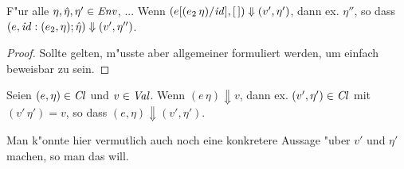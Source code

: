 \documentclass[12pt,fleqn,a4paper]{article}
\newcommand{\Cl}{\name{Cl}}
\begin{document}
\begin{lemma}[Koinzidenz] \label{lemma:Koinzidenz}
  F"ur alle $\eta,\hat{\eta},\eta'\in{\text{\it Env\/}}$, ...
  Wenn $(e[(e_2\,\eta)/{\text{\it id\/}}],[\,]) \Downarrow (v',\eta')$, dann ex. $\eta''$, so dass
  $(e,{\text{\it id\/}}:(e_2,\eta);\hat{\eta}) \Downarrow (v',\eta'')$.
\end{lemma}

\begin{proof}
  Sollte gelten, m"usste aber allgemeiner formuliert werden, um einfach beweisbar zu sein.
\end{proof}

\begin{theorem} \label{theorem:Vollstaendigkeit}
  Seien $(e,\eta)\in\Cl$ und $v \in {\text{\it Val\/}}$.
  Wenn $(e\,\eta) \Downarrow v$, dann ex. $(v',\eta')\in\Cl$ mit $(v'\,\eta') = v$, so dass
  $(e,\eta) \Downarrow (v',\eta')$.
\end{theorem}

Man k"onnte hier vermutlich auch noch eine konkretere Aussage "uber $v'$ und $\eta'$ machen, so man das will.
\end{document}
